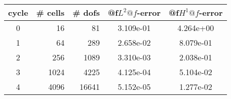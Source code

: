 \documentclass[10pt]{report}
\begin{document}
\begin{table}[H]
\begin{center}
\begin{tabular}{|c|r|r|c|c|} \hline
cycle & \# cells & \# dofs & @f$L^2@f$-error & @f$H^1@f$-error\\ \hline
0 & 16 & 81 & 3.109e-01 & 4.264e+00\\ \hline
1 & 64 & 289 & 2.658e-02 & 8.079e-01\\ \hline
2 & 256 & 1089 & 3.310e-03 & 2.038e-01\\ \hline
3 & 1024 & 4225 & 4.125e-04 & 5.104e-02\\ \hline
4 & 4096 & 16641 & 5.152e-05 & 1.277e-02\\ \hline
\end{tabular}
\end{center}
\end{table}
\end{document}
